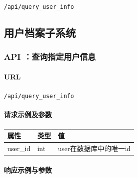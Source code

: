 \documentclass[]{article}
\let\oldparagraph\paragraph
\renewcommand{\paragraph}[1]{\oldparagraph{#1}\mbox{}}
\begin{document}
\texttt{/api/query\_user\_info}

\hypertarget{ux7528ux6237ux6863ux6848ux5b50ux7cfbux7edf}{%
\subsection{用户档案子系统}\label{ux7528ux6237ux6863ux6848ux5b50ux7cfbux7edf}}

\hypertarget{api-ux67e5ux8be2ux6307ux5b9aux7528ux6237ux4fe1ux606f}{%
\subsubsection{API
：查询指定用户信息}\label{api-ux67e5ux8be2ux6307ux5b9aux7528ux6237ux4fe1ux606f}}

\hypertarget{url-7}{%
\paragraph{URL}\label{url-7}}

\texttt{/api/query\_user\_info}

\hypertarget{ux8bf7ux6c42ux793aux4f8bux53caux53c2ux6570-5}{%
\paragraph{请求示例及参数}\label{ux8bf7ux6c42ux793aux4f8bux53caux53c2ux6570-5}}

\begin{Shaded}
\begin{Highlighting}[]
\FunctionTok{\{}
     \FunctionTok{:} 
\FunctionTok{\}}
\end{Highlighting}
\end{Shaded}

\begin{longtable}[]{@{}lll@{}}
\toprule
属性 & 类型 & 值\tabularnewline
\midrule
\endhead
user\_id & int & user在数据库中的唯一id\tabularnewline
\bottomrule
\end{longtable}

\hypertarget{ux54cdux5e94ux793aux4f8bux4e0eux53c2ux6570-3}{%
\paragraph{响应示例与参数}\label{ux54cdux5e94ux793aux4f8bux4e0eux53c2ux6570-3}}

\begin{Shaded}
\begin{Highlighting}[]
\FunctionTok{\{}
    \FunctionTok{:}\FunctionTok{,}
    \FunctionTok{:}\FunctionTok{,}
    \FunctionTok{:}\FunctionTok{,}
    \FunctionTok{:}\FunctionTok{,}
    \FunctionTok{:}\FunctionTok{,}
    \FunctionTok{:}\FunctionTok{,}
    \FunctionTok{:}\FunctionTok{,}
    \FunctionTok{:}
\FunctionTok{\}}
\end{Highlighting}
\end{Shaded}
\end{document}
